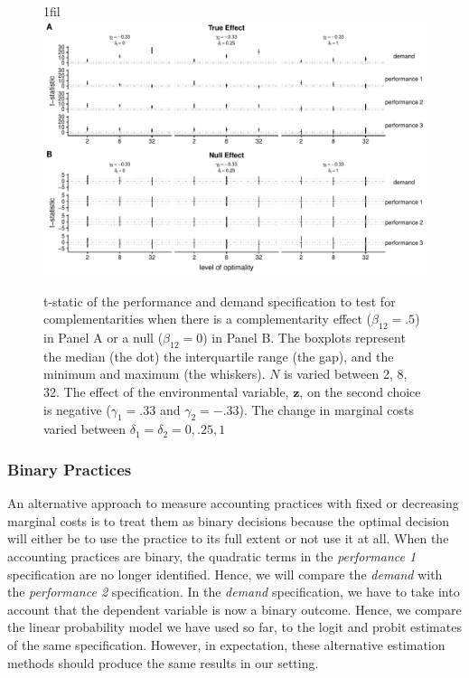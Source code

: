 \documentclass[12pt]{article}
\makeatletter
\newcommand*{\centerfloat}{%
  \parindent \z@
  \leftskip \z@ \@plus 1fil \@minus \textwidth
  \rightskip\leftskip
  \parfillskip \z@skip}
\makeatother
\begin{document}
\begin{figure}
\centerfloat
\includegraphics[width=450px]{figure-latex/delta_new_plot.pdf}
\caption[The Error Rate and Power with Different Levels of Marginal Costs]
{\label{delta} t-static of the performance and demand specification to test
for complementarities when there is a complementarity effect ($\beta_{12} = .5$)
in Panel A or a null ($\beta_{12} = 0$) in Panel B. The boxplots represent the median (the dot) the interquartile range (the gap), and the minimum and maximum (the whiskers). $N$ is varied between 2, 8, 32. The effect of the environmental variable, $\mathbf{z}$, on the second choice is negative ($\gamma_1 = .33$ and $\gamma_2 = -.33$). The change in marginal costs varied between $\delta_1 = \delta_2 = 0, .25, 1$}
\end{figure}



\subsubsection{Binary Practices}\label{binary-practices}

An alternative approach to measure accounting practices with fixed or decreasing marginal costs is to treat them as binary decisions because the optimal decision will either be to use the practice to its full extent or not use it at all. When the accounting practices are binary, the quadratic terms in the \emph{performance 1} specification are no longer identified. Hence, we will compare the \emph{demand} with the \emph{performance 2} specification. In the \emph{demand} specification, we have to take into account that the dependent variable is now a binary outcome. Hence, we compare the linear probability model we have used so far, to the logit and probit estimates of the same specification. However, in expectation, these alternative estimation methods should produce the same results in our setting. 
\end{document}
